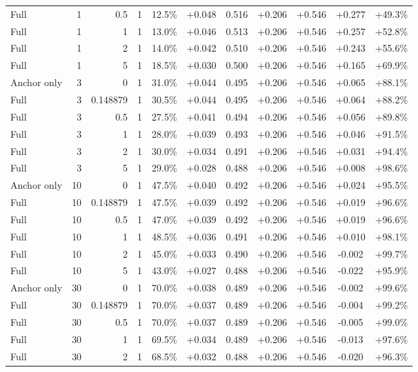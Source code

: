 \begin{table}[htbp]
\begin{tabular}{lrrrccccccc}
Full & 1 & 0.5 & 1 & 12.5\% & +0.048 & 0.516 & +0.206 & +0.546 & +0.277 & +49.3\% \\
Full & 1 & 1 & 1 & 13.0\% & +0.046 & 0.513 & +0.206 & +0.546 & +0.257 & +52.8\% \\
Full & 1 & 2 & 1 & 14.0\% & +0.042 & 0.510 & +0.206 & +0.546 & +0.243 & +55.6\% \\
Full & 1 & 5 & 1 & 18.5\% & +0.030 & 0.500 & +0.206 & +0.546 & +0.165 & +69.9\% \\
Anchor only & 3 & 0 & 1 & 31.0\% & +0.044 & 0.495 & +0.206 & +0.546 & +0.065 & +88.1\% \\
Full & 3 & 0.148879 & 1 & 30.5\% & +0.044 & 0.495 & +0.206 & +0.546 & +0.064 & +88.2\% \\
Full & 3 & 0.5 & 1 & 27.5\% & +0.041 & 0.494 & +0.206 & +0.546 & +0.056 & +89.8\% \\
Full & 3 & 1 & 1 & 28.0\% & +0.039 & 0.493 & +0.206 & +0.546 & +0.046 & +91.5\% \\
Full & 3 & 2 & 1 & 30.0\% & +0.034 & 0.491 & +0.206 & +0.546 & +0.031 & +94.4\% \\
Full & 3 & 5 & 1 & 29.0\% & +0.028 & 0.488 & +0.206 & +0.546 & +0.008 & +98.6\% \\
Anchor only & 10 & 0 & 1 & 47.5\% & +0.040 & 0.492 & +0.206 & +0.546 & +0.024 & +95.5\% \\
Full & 10 & 0.148879 & 1 & 47.5\% & +0.039 & 0.492 & +0.206 & +0.546 & +0.019 & +96.6\% \\
Full & 10 & 0.5 & 1 & 47.0\% & +0.039 & 0.492 & +0.206 & +0.546 & +0.019 & +96.6\% \\
Full & 10 & 1 & 1 & 48.5\% & +0.036 & 0.491 & +0.206 & +0.546 & +0.010 & +98.1\% \\
Full & 10 & 2 & 1 & 45.0\% & +0.033 & 0.490 & +0.206 & +0.546 & -0.002 & +99.7\% \\
Full & 10 & 5 & 1 & 43.0\% & +0.027 & 0.488 & +0.206 & +0.546 & -0.022 & +95.9\% \\
Anchor only & 30 & 0 & 1 & 70.0\% & +0.038 & 0.489 & +0.206 & +0.546 & -0.002 & +99.6\% \\
Full & 30 & 0.148879 & 1 & 70.0\% & +0.037 & 0.489 & +0.206 & +0.546 & -0.004 & +99.2\% \\
Full & 30 & 0.5 & 1 & 70.0\% & +0.037 & 0.489 & +0.206 & +0.546 & -0.005 & +99.0\% \\
Full & 30 & 1 & 1 & 69.5\% & +0.034 & 0.489 & +0.206 & +0.546 & -0.013 & +97.6\% \\
Full & 30 & 2 & 1 & 68.5\% & +0.032 & 0.488 & +0.206 & +0.546 & -0.020 & +96.3\% \\

\end{tabular}
\end{table}
